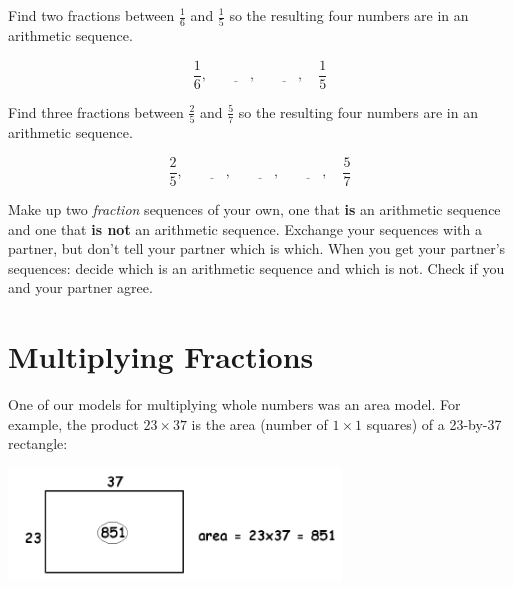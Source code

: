 \begin{problem}
Find two fractions between $\frac 1 6$ and $\frac 1 5$ so the resulting four numbers are in an arithmetic sequence.


\[
\frac 1 6, \quad \underline{\qquad}, \quad  \underline{\qquad}, \quad \frac 1 5
\]



\end{problem}



\begin{problem}
Find three fractions between $\frac 2 5$ and $\frac 5 7$ so the resulting four numbers are in an arithmetic sequence.

\[
\frac 2 5, \quad \underline{\qquad}, \quad \underline{\qquad}, \quad  \underline{\qquad}, \quad \frac 5 7 
\]





\end{problem}


\begin{thinkpair*}
Make up two \emph{fraction} sequences of your own, one that {\bf is} an arithmetic sequence and one that {\bf is not} an arithmetic sequence.  Exchange your sequences with a partner, but don't tell your partner which is which.  When you get your partner's sequences: decide which is an arithmetic sequence and which is not.  Check if you and your partner agree.

\end{thinkpair*}








\section{Multiplying Fractions}

One of our models for  multiplying whole numbers was  an area model. For
example, the product $23\times 37$ is the area (number of $1\times 1 $ squares) of a 23-by-37 rectangle:
\begin{center}
\includegraphics[height = 3cm]{areamodel1}
\end{center}

